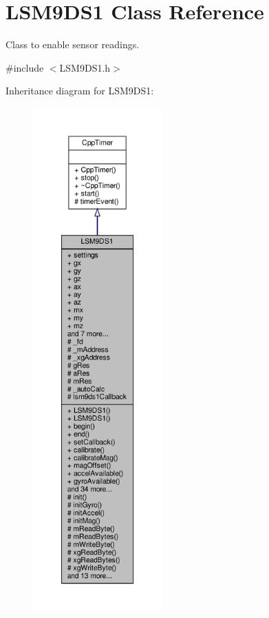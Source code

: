 \hypertarget{classLSM9DS1}{}\section{L\+S\+M9\+D\+S1 Class Reference}
\label{classLSM9DS1}


Class to enable sensor readings.  




{\ttfamily \#include $<$L\+S\+M9\+D\+S1.\+h$>$}



Inheritance diagram for L\+S\+M9\+D\+S1\+:\nopagebreak
\begin{figure}[H]
\begin{center}
\leavevmode
\includegraphics[height=550pt]{classLSM9DS1__inherit__graph}
\end{center}
\end{figure}


